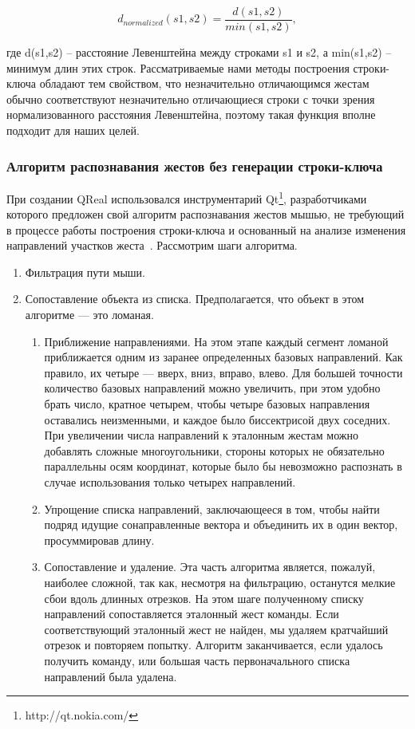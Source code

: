 \documentclass[a5paper]{article}
\begin{document}
\begin{equation}
\label{levenshtein}
d_{normalized}(s1,s2) = \frac{d(s1,s2)}{min(s1,s2)},
\end{equation}

где d(s1,s2) -- расстояние Левенштейна между строками s1 и s2, а min(s1,s2) -- минимум длин этих строк. Рассматриваемые нами методы построения строки-ключа обладают тем свойством, что незначительно отличающимся жестам обычно соответствуют незначительно отличающиеся строки с точки зрения нормализованного расстояния Левенштейна, поэтому такая функция вполне подходит для наших целей.

\subsubsection{Алгоритм распознавания жестов без генерации строки-ключа}
\label{qtAlgorithm}
При создании QReal использовался инструментарий Qt\footnote{http://qt.nokia.com/}, разработчиками которого предложен свой алгоритм распознавания жестов мышью, не требующий в процессе работы построения строки-ключа и основанный на анализе изменения направлений участков жеста~\cite{qtGestures}. Рассмотрим шаги алгоритма.
\begin{enumerate}
  \item Фильтрация пути мыши.
  \item Сопоставление объекта из списка. Предполагается, что объект в этом алгоритме --- это ломаная.
  \begin{enumerate}
    \item Приближение направлениями. На этом этапе каждый сегмент ломаной приближается одним из заранее определенных базовых направлений. Как правило, их четыре --- вверх, вниз, вправо, влево. Для большей точности количество базовых направлений можно увеличить, при этом удобно брать число, кратное четырем, чтобы четыре базовых направления оставались неизменными, и каждое было биссектрисой двух соседних. При увеличении числа направлений к эталонным жестам можно добавлять сложные многоугольники, стороны которых не обязательно параллельны осям координат, которые было бы невозможно распознать в случае использования только четырех направлений.
    \item Упрощение списка направлений, заключающееся в том, чтобы найти подряд идущие сонаправленные вектора и объединить их в один вектор, просуммировав длину.
    \item Сопоставление и удаление. Эта часть алгоритма является, пожалуй, наиболее сложной, так как, несмотря на фильтрацию, останутся мелкие сбои вдоль длинных отрезков. На этом шаге полученному списку направлений сопоставляется эталонный жест команды. Если соответствующий эталонный жест не найден, мы удаляем кратчайший отрезок и повторяем попытку. Алгоритм заканчивается, если удалось получить команду, или большая часть первоначального списка направлений была удалена.
  \end{enumerate}
\end{enumerate}
\end{document}
